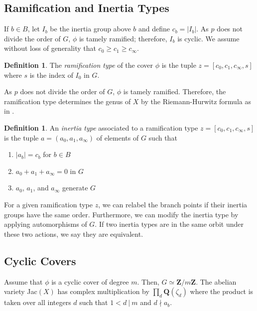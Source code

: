 \documentclass{article}
\theoremstyle{remark}
\theoremstyle{definition}
\newtheorem{definition}[theorem]{Definition}
\begin{document}
\subsection{Ramification and Inertia Types}
\par \hspace{\parindent} If $b \in B$, let $I_b$ be the inertia group above $b$ and define $c_b = |I_b|$. As $p$ does not divide the order of $G$, $\phi$ is tamely ramified; therefore, $I_b$ is cyclic. We assume without loss of generality that $c_0 \geq c_1 \geq c_\infty$.
\begin{definition}
    The \textit{ramification type} of the cover $\phi$ is the tuple $z = [c_0,c_1,c_\infty, s]$ where $s$ is the index of $I_0$ in $G$.
\end{definition}
\par As $p$ does not divide the order of $G$, $\phi$ is tamely ramified. Therefore, the ramification type determines the genus of $X$ by the Riemann-Hurwitz formula as in \cite[Lemma 2.3]{booher_supersingular_2025}.
\begin{definition}
    An \textit{inertia type} associated to a ramification type $z = [c_0,c_1,c_\infty, s]$ is the tuple $a = (a_0, a_1, a_\infty)$ of elements of $G$ such that 
    \begin{enumerate}[(1)]
        \item $|a_b| = c_b$ for $b \in B$
        \item $a_0+a_1+a_\infty = 0$ in $G$
        \item $a_0$, $a_1$, and $a_\infty$ generate $G$
    \end{enumerate}
\end{definition}
\par For a given ramification type $z$, we can relabel the branch points if their inertia groups have the same order. Furthermore, we can modify the inertia type by applying automorphisms of $G$. If two inertia types are in the same orbit under these two actions, we say they are equivalent.

\subsection{Cyclic Covers}
\par \hspace{\parindent} Assume that $\phi$ is a cyclic cover of degree $m$. Then, $G \simeq \mathbf{Z}/m\mathbf{Z}$. The abelian variety Jac$(X)$ has complex multiplication by $\prod_d  \mathbf{Q}(\zeta_d)$ where the product is taken over all integers $d$ such that $1 < d  \ | \ m$ and $d \nmid a_b$.
\end{document}
